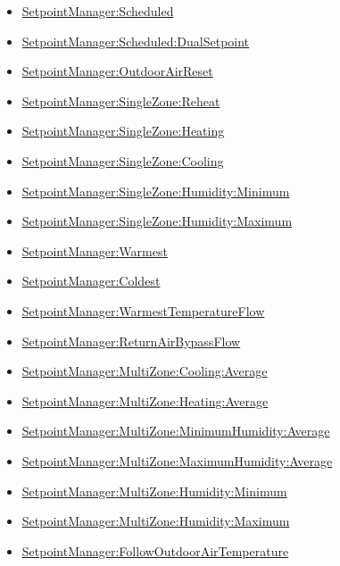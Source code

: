 \begin{itemize}
\item
  \hyperref[setpointmanagerscheduled]{SetpointManager:Scheduled}
\item
  \hyperref[setpointmanagerscheduleddualsetpoint]{SetpointManager:Scheduled:DualSetpoint}
\item
  \hyperref[setpointmanageroutdoorairreset]{SetpointManager:OutdoorAirReset}
\item
  \hyperref[setpointmanagersinglezonereheat]{SetpointManager:SingleZone:Reheat}
\item
  \hyperref[setpointmanagersinglezoneheating]{SetpointManager:SingleZone:Heating}
\item
  \hyperref[setpointmanagersinglezonecooling]{SetpointManager:SingleZone:Cooling}
\item
  \hyperref[setpointmanagersinglezonehumidityminimum]{SetpointManager:SingleZone:Humidity:Minimum}
\item
  \hyperref[setpointmanagersinglezonehumiditymaximum]{SetpointManager:SingleZone:Humidity:Maximum}
\item
  \hyperref[setpointmanagerwarmest]{SetpointManager:Warmest}
\item
  \hyperref[setpointmanagercoldest]{SetpointManager:Coldest}
\item
  \hyperref[setpointmanagerwarmesttemperatureflow]{SetpointManager:WarmestTemperatureFlow}
\item
  \hyperref[setpointmanagerreturnairbypassflow]{SetpointManager:ReturnAirBypassFlow}
\item
  \hyperref[setpointmanagermultizonecoolingaverage]{SetpointManager:MultiZone:Cooling:Average}
\item
  \hyperref[setpointmanagermultizoneheatingaverage]{SetpointManager:MultiZone:Heating:Average}
\item
  \hyperref[setpointmanagermultizoneminimumhumidityaverage]{SetpointManager:MultiZone:MinimumHumidity:Average}
\item
  \hyperref[setpointmanagermultizonemaximumhumidityaverage]{SetpointManager:MultiZone:MaximumHumidity:Average}
\item
  \hyperref[setpointmanagermultizonehumidityminimum]{SetpointManager:MultiZone:Humidity:Minimum}
\item
  \hyperref[setpointmanagermultizonehumiditymaximum]{SetpointManager:MultiZone:Humidity:Maximum}
\item
  \hyperref[setpointmanagerfollowoutdoorairtemperature]{SetpointManager:FollowOutdoorAirTemperature}

\end{itemize}
